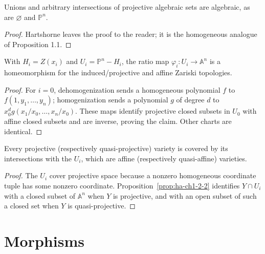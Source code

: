 \begin{proposition}
\label{prop:ha-ch1-2-1}
Unions and arbitrary intersections of projective algebraic sets are algebraic, as are $\varnothing$
and $\mathbb P^n$.
\end{proposition}
\begin{proof}
Hartshorne leaves the proof to the reader; it is the homogeneous analogue of Proposition 1.1.
\end{proof}

\begin{proposition}
\label{prop:ha-ch1-2-2}
With $H_i=Z(x_i)$ and $U_i=\mathbb P^n-H_i$, the ratio map
$\varphi_i:U_i\to\mathbb A^n$ is a homeomorphism for the induced/projective and affine Zariski
topologies.
\end{proposition}
\begin{proof}
For $i=0$, dehomogenization sends a homogeneous polynomial $f$ to $f(1,y_1,\ldots,y_n)$;
homogenization sends a polynomial $g$ of degree $d$ to
$x_0^d g(x_1/x_0,\ldots,x_n/x_0)$.  These maps identify projective closed subsets in $U_0$
with affine closed subsets and are inverse, proving the claim.  Other charts are identical.
\end{proof}

\begin{corollary}
\label{cor:ha-ch1-2-3}
Every projective (respectively quasi-projective) variety is covered by its intersections with the
$U_i$, which are affine (respectively quasi-affine) varieties.
\end{corollary}
\begin{proof}
The $U_i$ cover projective space because a nonzero homogeneous coordinate tuple has some nonzero
coordinate.  Proposition~\ref{prop:ha-ch1-2-2} identifies $Y\cap U_i$ with a closed subset of
$\mathbb A^n$ when $Y$ is projective, and with an open subset of such a closed set when $Y$ is
quasi-projective.
\end{proof}

\section{Morphisms}

